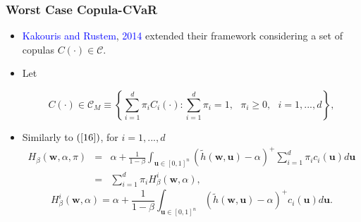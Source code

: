 \documentclass[pdf,10pt,xcolor=dvipsnames,hide notes]{beamer}
\begin{document}
\begin{frame}[label=frame3c]
	\frametitle{Worst Case Copula-CVaR}
	
	\begin{itemize}
		\justifying
		\item   
\textcolor{blue}{Kakouris and Rustem}, \textcolor{blue}{2014}  extended their framework considering a set of copulas $C\left( \cdot \right) \in \mathcal{C}
		$.
		
		\vspace{0.3cm}
		
		\item Let
		
		\begin{equation}
		C\left( \cdot \right) \in \mathcal{C}_{M}\equiv \left\{ \sum_{i=1}^{d}\pi
		_{i}C_{i}\left( \cdot \right) :\sum_{i=1}^{d}\pi _{i}=1,\text{ }\pi _{i}\geq
		0,\text{ }i=1,...,d\right\} ,  \label{28}
		\end{equation}%
		
		\vspace{0.3cm}
		
	\item Similarly to $\left( \ref{16}\right) $, for $i=1,...,d$
		\begin{eqnarray*}
		H_{\beta }\left( \mathbf{w},\alpha ,\pi \right) &=&\alpha +\frac{1}{1-\beta }
		\int_{\mathbf{u}\in \left[ 0,1\right] ^{n}}\left( \widetilde{h}\left( \mathbf{w,u}
		\right) -\alpha \right) ^{+}\sum_{i=1}^{d}\pi _{i}c_{i}\left( \mathbf{u}
		\right) d\mathbf{u}\\
		&=&\sum_{i=1}^{d}\pi _{i}H_{\beta }^{i}\left( \mathbf{w},\alpha \right) ,
	\end{eqnarray*}
		\begin{equation}
		H_{\beta }^{i}\left( \mathbf{w},\alpha \right) =\alpha +\frac{1}{1-\beta }
		\int_{\mathbf{u}\in \left[ 0,1\right] ^{n}}\left( \widetilde{h}\left( \mathbf{w,u}
		\right) -\alpha \right) ^{+}c_{i}\left( \mathbf{u}\right) d\mathbf{u}. \label{30}
		\end{equation}%
	
\end{itemize}	
\end{frame}
\end{document}
